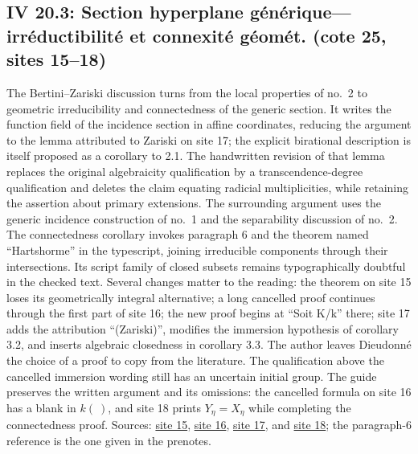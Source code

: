 \subsection*{IV 20.3: Section hyperplane générique---irréductibilité et connexité géomét. (cote 25, sites 15--18)}
The Bertini--Zariski discussion turns from the local properties of no.\ 2 to geometric irreducibility and connectedness of the generic section. It writes the function field of the incidence section in affine coordinates, reducing the argument to the lemma attributed to Zariski on site 17; the explicit birational description is itself proposed as a corollary to 2.1. The handwritten revision of that lemma replaces the original algebraicity qualification by a transcendence-degree qualification and deletes the claim equating radicial multiplicities, while retaining the assertion about primary extensions. The surrounding argument uses the generic incidence construction of no.\ 1 and the separability discussion of no.\ 2. The connectedness corollary invokes paragraph 6 and the theorem named ``Hartshorme'' in the typescript, joining irreducible components through their intersections. Its script family of closed subsets remains typographically doubtful in the checked text. Several changes matter to the reading: the theorem on site 15 loses its geometrically integral alternative; a long cancelled proof continues through the first part of site 16; the new proof begins at ``Soit K/k'' there; site 17 adds the attribution ``(Zariski)'', modifies the immersion hypothesis of corollary 3.2, and inserts algebraic closedness in corollary 3.3. The author leaves Dieudonné the choice of a proof to copy from the literature. The qualification above the cancelled immersion wording still has an uncertain initial group. The guide preserves the written argument and its omissions: the cancelled formula on site 16 has a blank in $k(\ )$, and site 18 prints $Y_\eta=X_\eta$ while completing the connectedness proof. Sources: \href{https://grothendieck.umontpellier.fr/web/viewer.html?file=../25.pdf\#page=16}{site 15}, \href{https://grothendieck.umontpellier.fr/web/viewer.html?file=../25.pdf\#page=17}{site 16}, \href{https://grothendieck.umontpellier.fr/web/viewer.html?file=../25.pdf\#page=18}{site 17}, and \href{https://grothendieck.umontpellier.fr/web/viewer.html?file=../25.pdf\#page=19}{site 18}; the paragraph-6 reference is the one given in the prenotes.
